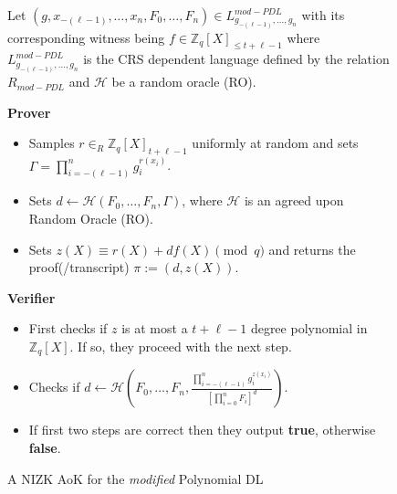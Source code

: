 \begin{figure}[ht]
    \centering
    \begin{tcolorbox}[title=$\pi_{PDL}^{mod}$, width=0.9\textwidth, colframe=blue!75!black, colback=blue!10, sharp corners]
        Let $(g,x_{-(\ell-1)},\dots,x_n,F_0,\dots,F_n)\in L_{g_{-(\ell-1)},\dots,g_n}^{mod-PDL}$ with its corresponding witness being $f\in\mathbb{Z}_q[X]_{\leq t+\ell-1}$ 
        where $L_{g_{-(\ell-1)},\dots,g_n}^{mod-PDL}$ is the CRS dependent language defined by 
        the relation $R_{mod-PDL}$ and $\mathcal{H}$ be a random oracle (RO).
        
        \vspace{0.5em}
        \textbf{Prover}
        \begin{itemize}
            \item Samples $r\in_{R}\mathbb{Z}_q[X]_{t+\ell-1}$ uniformly at random and sets 
                $\Gamma=\prod_{i=-(\ell-1)}^{n}g_i^{r(x_i)}$.
            \item Sets $d\leftarrow \mathcal{H}(F_0, \dots, F_n, \Gamma)$, where $\mathcal{H}$ is 
                an agreed upon Random Oracle (RO).
            \item Sets $z(X)\equiv r(X)+df(X) \pmod{q}$ and returns the proof(/transcript) $\pi:= (d,z(X))$.
        \end{itemize}
        
        \vspace{0.5em}
        \textbf{Verifier}
        \begin{itemize}
            \item First checks if $z$ is at most a $t+\ell-1$ degree polynomial in $\mathbb{Z}_q[X]$. If so, they proceed with the next step.
            \item Checks if $d\leftarrow \mathcal{H}(F_0, \dots, F_n,\frac{\prod_{i=-(\ell-1)}^{n}g_i^{z(x_i)}}{[\prod_{i=0}^{n}F_i]^d})$. 
            \item If first two steps are correct then they output \textbf{true}, otherwise \textbf{false}.
        \end{itemize}
    \end{tcolorbox}
    \caption{A NIZK AoK for the \textit{modified} Polynomial DL}
    \label{fig:mod-polynomial-dl}
\end{figure}
